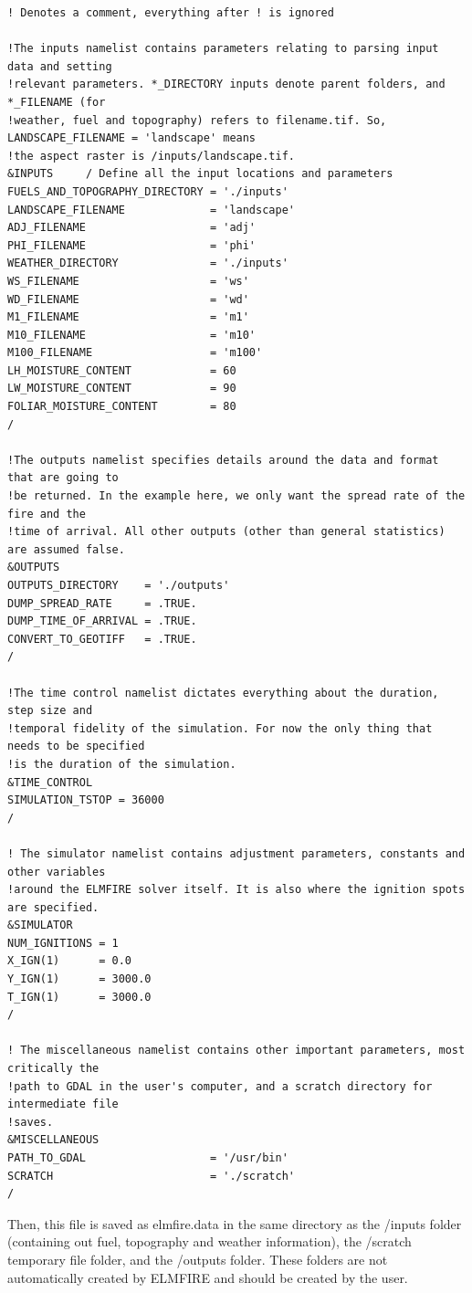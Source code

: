 \begin{verbatim}
! Denotes a comment, everything after ! is ignored

!The inputs namelist contains parameters relating to parsing input data and setting 
!relevant parameters. *_DIRECTORY inputs denote parent folders, and *_FILENAME (for 
!weather, fuel and topography) refers to filename.tif. So, LANDSCAPE_FILENAME = 'landscape' means
!the aspect raster is /inputs/landscape.tif.
&INPUTS     / Define all the input locations and parameters
FUELS_AND_TOPOGRAPHY_DIRECTORY = './inputs' 
LANDSCAPE_FILENAME             = 'landscape'
ADJ_FILENAME                   = 'adj'
PHI_FILENAME                   = 'phi'
WEATHER_DIRECTORY              = './inputs' 
WS_FILENAME                    = 'ws'
WD_FILENAME                    = 'wd'
M1_FILENAME                    = 'm1'
M10_FILENAME                   = 'm10'
M100_FILENAME                  = 'm100'
LH_MOISTURE_CONTENT            = 60
LW_MOISTURE_CONTENT            = 90
FOLIAR_MOISTURE_CONTENT        = 80
/

!The outputs namelist specifies details around the data and format that are going to
!be returned. In the example here, we only want the spread rate of the fire and the 
!time of arrival. All other outputs (other than general statistics) are assumed false.
&OUTPUTS
OUTPUTS_DIRECTORY    = './outputs'
DUMP_SPREAD_RATE     = .TRUE.
DUMP_TIME_OF_ARRIVAL = .TRUE.
CONVERT_TO_GEOTIFF   = .TRUE.
/

!The time control namelist dictates everything about the duration, step size and 
!temporal fidelity of the simulation. For now the only thing that needs to be specified
!is the duration of the simulation.
&TIME_CONTROL
SIMULATION_TSTOP = 36000
/

! The simulator namelist contains adjustment parameters, constants and other variables
!around the ELMFIRE solver itself. It is also where the ignition spots are specified. 
&SIMULATOR
NUM_IGNITIONS = 1
X_IGN(1)      = 0.0
Y_IGN(1)      = 3000.0
T_IGN(1)      = 3000.0
/

! The miscellaneous namelist contains other important parameters, most critically the
!path to GDAL in the user's computer, and a scratch directory for intermediate file 
!saves. 
&MISCELLANEOUS
PATH_TO_GDAL                   = '/usr/bin'
SCRATCH                        = './scratch'
/
\end{verbatim}

Then, this file is saved as elmfire.data in the same directory as the /inputs folder (containing out fuel, topography and weather information), the /scratch temporary file folder, and the /outputs folder. These folders are not automatically created by ELMFIRE and should be created by the user. 

